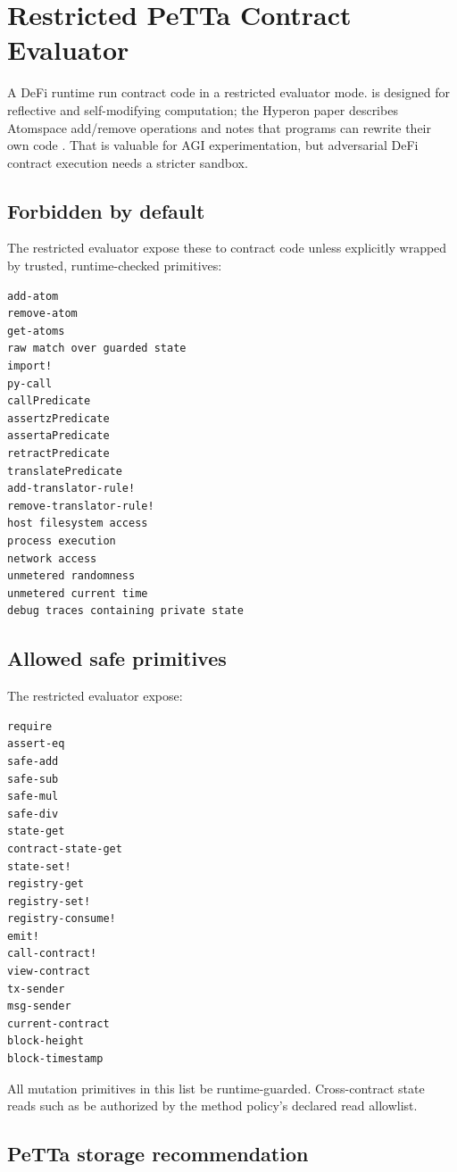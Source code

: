 \section{Restricted PeTTa Contract Evaluator}

A \PeTTa{} DeFi runtime \MUST{} run contract code in a restricted evaluator mode. \MeTTa{} is designed for reflective and self-modifying computation; the Hyperon paper describes Atomspace add/remove operations and notes that \MeTTa{} programs can rewrite their own code \cite{hyperon-paper}. That is valuable for AGI experimentation, but adversarial DeFi contract execution needs a stricter sandbox.

\subsection{Forbidden by default}

The restricted evaluator \MUSTNOT{} expose these to contract code unless explicitly wrapped by trusted, runtime-checked primitives:

\begin{lstlisting}
add-atom
remove-atom
get-atoms
raw match over guarded state
import!
py-call
callPredicate
assertzPredicate
assertaPredicate
retractPredicate
translatePredicate
add-translator-rule!
remove-translator-rule!
host filesystem access
process execution
network access
unmetered randomness
unmetered current time
debug traces containing private state
\end{lstlisting}

\subsection{Allowed safe primitives}

The restricted evaluator \MAY{} expose:

\begin{lstlisting}
require
assert-eq
safe-add
safe-sub
safe-mul
safe-div
state-get
contract-state-get
state-set!
registry-get
registry-set!
registry-consume!
emit!
call-contract!
view-contract
tx-sender
msg-sender
current-contract
block-height
block-timestamp
\end{lstlisting}

All mutation primitives in this list \MUST{} be runtime-guarded.
Cross-contract state reads such as  \MUST{} be
authorized by the method policy's declared read allowlist.

\subsection{PeTTa storage recommendation}

